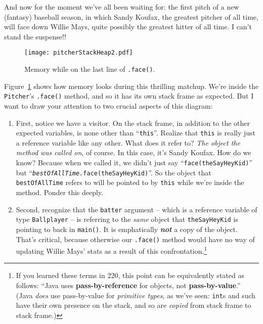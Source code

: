 And now for the moment we've all been waiting for: the first pitch of a new
(fantasy) baseball season, in which Sandy Koufax, the greatest pitcher of all
time, will face down Willie Mays, quite possibly the greatest hitter of all
time. I can't stand the suspense!!

\begin{figure}
\centering
\texttt{[image: pitcherStackHeap2.pdf]}  %
\caption{Memory while on the last line of \texttt{.face()}.}
\label{fig:pitcherStackHeap2}
\end{figure}

Figure~\ref{fig:pitcherStackHeap2} shows how memory looks during this
thrilling matchup. We're inside the \texttt{Pitcher}'s \texttt{.face()}
method, and so it has its own stack frame as expected. But I want to draw your
attention to two crucial aspects of this diagram:

\begin{enumerate}
\itemsep.1em
\item First, notice we have a visitor. On the stack frame, in addition to the
other expected variables, is none other than ``\texttt{this}''. Realize that
\texttt{this} is really just a reference variable like any other. What does it
refer to? \textit{The object the method was called on}, of course. In this
case, it's Sandy Koufax. How do we know? Because when we called it, we didn't
just say ``\texttt{face(theSayHeyKid)}'' but
``\texttt{\textit{bestOfAllTime.}face(theSayHeyKid)}''. So the object that
\texttt{bestOfAllTime} refers to will be pointed to by \texttt{this} while
we're inside the method. Ponder this deeply.

\item Second, recognize that the \texttt{batter} argument -- which is a
reference variable of type \texttt{Ballplayer} -- is referring to the
\textit{same} object that \texttt{theSayHeyKid} is pointing to back in
\texttt{main()}. It is emphatically \textbf{\textit{not}} a copy of the
object. That's critical, because otherwise our \texttt{.face()} method would
have no way of updating Willie Mays' stats as a result of this
confrontation.\footnote{If you learned these terms in 220, this point can be
equivalently stated as follows: ``Java uses \textbf{pass-by-reference} for
objects, not \textbf{pass-by-value}.'' (Java \textit{does} use pass-by-value
for \textit{primitive types}, as we've seen: \texttt{int}s and such have their
own presence on the stack, and so are \textit{copied} from stack frame to
stack frame.)}

\end{enumerate}

